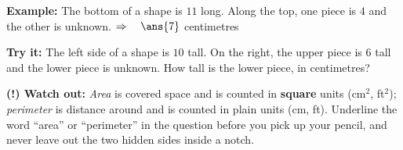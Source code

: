 \documentclass[12pt]{article}
\begin{document}
\begin{examplebox}
\textbf{Example:} The bottom of a shape is $11$ long. Along the top, one piece is $4$ and the
other is unknown.
$\Rightarrow\quad \ans{7}$ centimetres
\end{examplebox}

\begin{tryitbox}
\textbf{Try it:} The left side of a shape is $10$ tall. On the right, the upper piece is $6$ tall
and the lower piece is unknown. How tall is the lower piece, in centimetres?\\[2pt]
\end{tryitbox}

\begin{watchoutbox}
\textbf{(!) Watch out:} \emph{Area} is covered space and is counted in \textbf{square} units
(cm$^2$, ft$^2$); \emph{perimeter} is distance around and is counted in plain units (cm, ft).
Underline the word ``area'' or ``perimeter'' in the question before you pick up your pencil, and
never leave out the two hidden sides inside a notch.
\end{watchoutbox}
\end{document}
